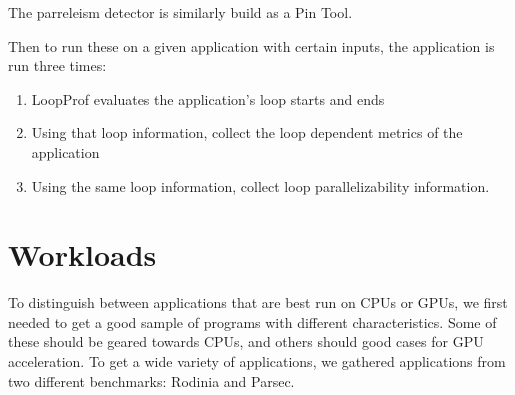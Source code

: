 \documentclass[12pt,twoside]{reedthesis}
\begin{document}
		The parreleism detector is similarly build as a Pin Tool. 
		
		Then to run these on a given application with certain inputs, the application is run three times:
		
		\begin{enumerate}
			\item LoopProf evaluates the application's loop starts and ends
			\item Using that loop information, collect the loop dependent metrics of the application
			\item Using the same loop information, collect loop parallelizability information. 
		\end{enumerate}
		
	\section{Workloads}
		
		To distinguish between applications that are best run on CPUs or GPUs, we first needed to get a good sample of programs with different characteristics. Some of these should be geared towards CPUs, and others should good cases for GPU acceleration. To get a wide variety of applications, we gathered applications from two different benchmarks: Rodinia and Parsec.
		
\end{document}
